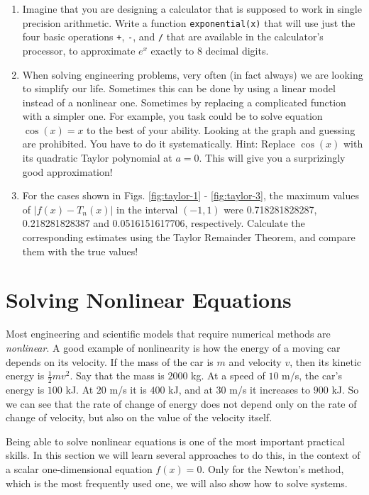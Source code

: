 \documentclass[article,A4,12pt]{llncs}
\begin{document}
\begin{enumerate}
\item Imagine that you are designing a calculator that is supposed to work in 
single precision arithmetic. Write a function {\tt exponential(x)} that will
use just the four basic operations {\tt +}, {\tt -}, {\tt *} and {\tt /} that 
are available in the calculator's processor, to approximate $e^x$ exactly to 8
decimal digits.
\item When solving engineering problems, very often (in fact always) we are 
looking to simplify our life. Sometimes this can be done by using a linear model instead of 
a nonlinear one. Sometimes by replacing a complicated function 
with a simpler one. For example, you task could be to solve equation $\cos(x) = x$
to the best of your ability. Looking at the graph and guessing are prohibited. 
You have to do it systematically. Hint: Replace $\cos(x)$ with its quadratic Taylor 
polynomial at $a = 0$. This will give you a surprizingly good approximation!
\item For the cases shown in Figs. \ref{fig:taylor-1} - \ref{fig:taylor-3}, the 
maximum values of $|f(x) - T_n(x)|$ in the interval 
$(-1, 1)$ were 0.718281828287, 0.218281828387 and 0.0516151617706, respectively.
Calculate the corresponding estimates using the Taylor Remainder Theorem, and compare
them with the true values! 
\end{enumerate}

\section{Solving Nonlinear Equations}

Most engineering and scientific models that require numerical methods are {\em nonlinear}.
A good example of nonlinearity is how the energy of a moving car depends on its velocity.
If the mass of the car is $m$ and velocity $v$, then its kinetic energy is $\frac{1}{2}mv^2$.
Say that the mass is $2000$ kg. At a speed of $10$ m/s, the car's energy is $100$ kJ. At 
$20$ m/s it is $400$ kJ, and at $30$ m/s it increases to $900$ kJ. So we can see that 
the rate of change of energy does not depend only on the rate of change of velocity,
but also on the value of the velocity itself. 
 
Being able to solve nonlinear equations is one of the most important 
practical skills. In this section we will learn several approaches to do this,
in the context of a scalar one-dimensional equation $f(x) = 0$. Only for the 
Newton's method, which is the most frequently used one, we will also 
show how to solve systems. 
\end{document}
